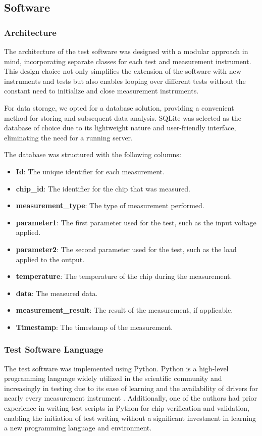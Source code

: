 

\subsection{Software}

\subsubsection{Architecture}
The architecture of the test software was designed with a modular approach in mind, incorporating separate classes for each test and measurement instrument. This design choice not only simplifies the extension of the software with new instruments and tests but also enables looping over different tests without the constant need to initialize and close measurement instruments.

For data storage, we opted for a database solution, providing a convenient method for storing and subsequent data analysis. SQLite was selected as the database of choice due to its lightweight nature and user-friendly interface, eliminating the need for a running server.

The database was structured with the following columns:
\begin{itemize}
    \item \textbf{Id}: The unique identifier for each measurement.
    \item \textbf{chip\_id}: The identifier for the chip that was measured.
    \item \textbf{measurement\_type}: The type of measurement performed.
    \item \textbf{parameter1}: The first parameter used for the test, such as the input voltage applied.
    \item \textbf{parameter2}: The second parameter used for the test, such as the load applied to the output.
    \item \textbf{temperature}: The temperature of the chip during the measurement.
    \item \textbf{data}: The measured data.
    \item \textbf{measurement\_result}: The result of the measurement, if applicable.
    \item \textbf{Timestamp}: The timestamp of the measurement.
\end{itemize}

\subsubsection{Test Software Language}
The test software was implemented using Python. Python is a high-level programming language widely utilized in the scientific community and increasingly in testing due to its ease of learning and the availability of drivers for nearly every measurement instrument \cite{Wikipedia:Python}. Additionally, one of the authors had prior experience in writing test scripts in Python for chip verification and validation, enabling the initiation of test writing without a significant investment in learning a new programming language and environment.

